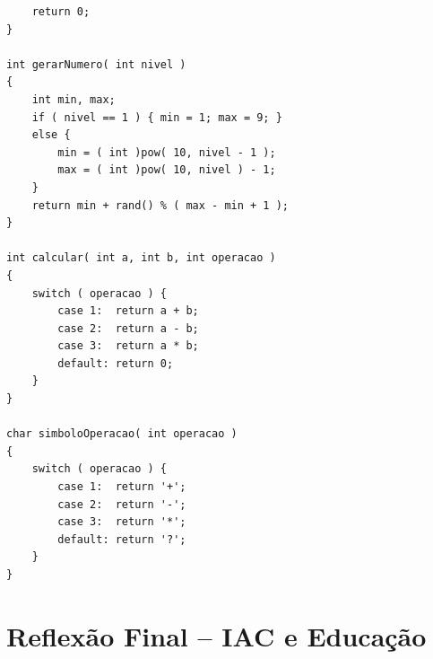 \documentclass[12pt,a4paper]{article}
\begin{document}
\begin{respostabox}
\begin{lstlisting}
    return 0;
}

int gerarNumero( int nivel )
{
    int min, max;
    if ( nivel == 1 ) { min = 1; max = 9; }
    else {
        min = ( int )pow( 10, nivel - 1 );
        max = ( int )pow( 10, nivel ) - 1;
    }
    return min + rand() % ( max - min + 1 );
}

int calcular( int a, int b, int operacao )
{
    switch ( operacao ) {
        case 1:  return a + b;
        case 2:  return a - b;
        case 3:  return a * b;
        default: return 0;
    }
}

char simboloOperacao( int operacao )
{
    switch ( operacao ) {
        case 1:  return '+';
        case 2:  return '-';
        case 3:  return '*';
        default: return '?';
    }
}
\end{lstlisting}
\end{respostabox}

\newpage

\section*{Reflexão Final -- IAC e Educação}
\end{document}
